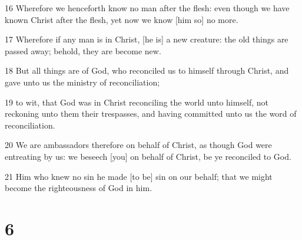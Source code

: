 \par 16 Wherefore we henceforth know no man after the flesh: even though we have known Christ after the flesh, yet now we know [him so] no more.
\par 17 Wherefore if any man is in Christ, [he is] a new creature: the old things are passed away; behold, they are become new.
\par 18 But all things are of God, who reconciled us to himself through Christ, and gave unto us the ministry of reconciliation;
\par 19 to wit, that God was in Christ reconciling the world unto himself, not reckoning unto them their trespasses, and having committed unto us the word of reconciliation.
\par 20 We are ambassadors therefore on behalf of Christ, as though God were entreating by us: we beseech [you] on behalf of Christ, be ye reconciled to God.
\par 21 Him who knew no sin he made [to be] sin on our behalf; that we might become the righteousness of God in him.

\chapter{6}

